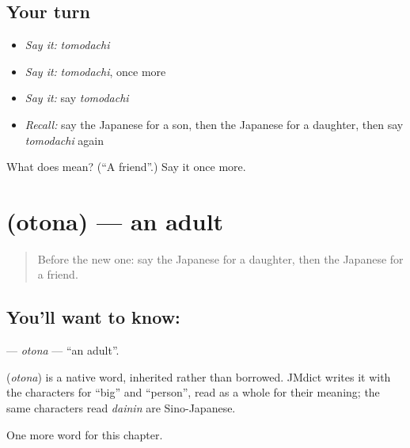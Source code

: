 \subsection*{Your turn}
\begin{itemize}
\raggedright
  \item \emph{Say it:} \emph{tomodachi}
  \item \emph{Say it:} \emph{tomodachi}, once more
  \item \emph{Say it:} say \emph{tomodachi}
  \item \emph{Recall:} say the Japanese for a son, then the Japanese for a daughter, then say \emph{tomodachi} again
\end{itemize}

\begin{tcolorbox}[breakable,colback=teal!4,colframe=teal!35!black,title={Before you move on}]
What does  mean? (\textquotedblleft{}A friend\textquotedblright{}.) Say it once more.
\end{tcolorbox}
\section[\texorpdfstring{\ja{おとな} (otona)}{おとな (otona)}]{ (otona) — an adult}

\label{lesson:JA-C25-otona}



\begin{quote}
Before the new one: say the Japanese for a daughter, then the Japanese for a friend.
\end{quote}

\subsection*{You'll want to know: }
\textbf{} — \emph{otona} — \textquotedblleft{}an adult\textquotedblright{}.

\begin{cousinweb}
\textbf{} (\emph{otona}) is a native word, inherited rather than borrowed. JMdict writes it with the characters for \textquotedblleft{}big\textquotedblright{} and \textquotedblleft{}person\textquotedblright{}, read as a whole for their meaning; the same characters read \emph{dainin} are Sino-Japanese.
\end{cousinweb}

\begin{grammarlens}[title={What you've built}]
One more word for this chapter.
\end{grammarlens}

